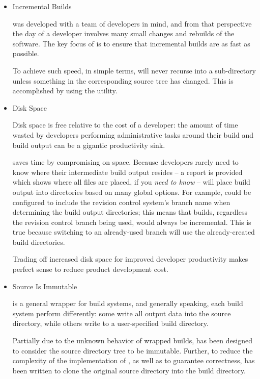 \begin{itemize}
\item Incremental Builds

  \lmsbw was developed with a team of developers in mind, and from that
  perspective the day of a developer involves many small changes and
  rebuilds of the software.  The key focus of \lmsbw is to ensure that
  incremental builds are as fast as possible.

  To achieve such speed, in simple terms, \lmsbw will never recurse
  into a sub-directory unless something in the corresponding source
  tree has changed.  This is accomplished by using the \mtree utility.

\item Disk Space

  Disk space is free relative to the cost of a developer: the amount
  of time wasted by developers performing administrative tasks around
  their build and build output can be a gigantic productivity sink.

  \lmsbw saves time by compromising on space.  Because developers
  rarely need to know where their intermediate build output resides --
  a report is provided which shows where all files are placed, if you
  \emph{need to know} -- \lmsbw will place build output into
  directories based on many global options.  For example, \lmsbw could
  be configured to include the revision control system's branch name
  when determining the build output directories; this means that
  builds, regardless the revision control branch being used, would
  always be incremental.  This is true because switching to an
  already-used branch will use the already-created build directories.

  Trading off increased disk space for improved developer productivity
  makes perfect sense to reduce product development cost.

\item Source Is Immutable

  \lmsbw is a general wrapper for build systems, and generally
  speaking, each build system perform differently: some write all
  output data into the source directory, while others write to a
  user-specified build directory.

  Partially due to the unknown behavior of wrapped builds, \lmsbw has
  been designed to consider the source directory tree to be immutable.
  Further, to reduce the complexity of the implementation of \lmsbw,
  as well as to guarantee correctness, \lmsbw has been written to
  clone the original source directory into the build directory.


\end{itemize}
